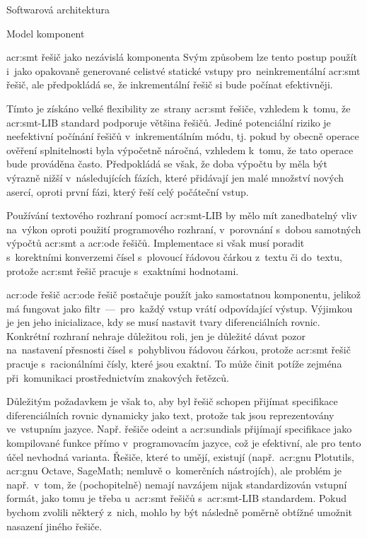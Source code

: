 \documentclass[thesis=M,czech]{FITthesis}[2012/06/26]
\newcommand{\acrlabel}[1]{acr:#1}
\newcommand{\acr}[1]{\acrshort{\acrlabel{#1}}}
\begin{document}
\begin{section}{Softwarová architektura}
\begin{subsection}{Model komponent}
\begin{subsubsection}{\acr{smt} řešič jako nezávislá komponenta}
Svým způsobem lze tento postup použít
i~jako opakovaně generované celistvé statické vstupy
pro~neinkrementální \acr{smt} řešič,
ale předpokládá se, že inkrementální řešič
si bude počínat efektivněji.

Tímto je získáno velké flexibility
ze~strany \acr{smt} řešiče,
vzhledem k~tomu, že \acr{smt}-LIB standard
podporuje většina řešičů.
Jediné potenciální riziko
je neefektivní počínání řešičů
v~inkrementálním módu,
tj. pokud by obecně operace ověření splnitelnosti
byla výpočetně náročná,
vzhledem k~tomu, že tato operace bude prováděna často.
Předpokládá se však,
že doba výpočtu by měla být výrazně nižší
v~následujících fázích,
které přidávají jen malé množství nových asercí,
oproti první fázi,
který řeší celý počáteční vstup.

Používání textového rozhraní pomocí \acr{smt}-LIB
by mělo mít zanedbatelný vliv na~výkon
oproti použití programového rozhraní,
v~porovnání s~dobou samotných výpočtů
\acr{smt} a \acr{ode} řešičů.
Implementace si však musí poradit
s~korektními konverzemi čísel s~plovoucí řádovou čárkou
z~textu či do~textu,
protože \acr{smt} řešič pracuje s~exaktními hodnotami.
\end{subsubsection} %


\begin{subsubsection}{\acr{ode} řešič}\label{sss:design:arch:comp:ode}
\acr{ode} řešič postačuje použít jako samostatnou komponentu,
jelikož má fungovat jako
filtr~---~pro~každý vstup vrátí odpovídající výstup.
Výjimkou je jen jeho inicializace,
kdy se musí nastavit tvary diferenciálních rovnic.
Konkrétní rozhraní nehraje důležitou roli,
jen je důležité dávat pozor na~nastavení přesnosti
čísel s~pohyblivou řádovou čárkou,
protože \acr{smt} řešič pracuje s~racionálními čísly,
které jsou exaktní. To může činit potíže zejména
při~komunikaci prostřednictvím znakových řetězců.

Důležitým požadavkem je však to,
aby byl řešič schopen přijímat
specifikace diferenciálních rovnic
dynamicky jako text,
protože tak jsou reprezentovány ve~vstupním jazyce.
Např. řešiče odeint a \acr{sundials}
přijímají specifikace jako kompilované funkce
přímo v~programovacím jazyce,
což je efektivní, ale pro tento účel
nevhodná varianta.
Řešiče, které to umějí, existují
(např.~\acr{gnu} Plotutils,
\acr{gnu} Octave, SageMath;
nemluvě o~komerčních nástrojích),
ale problém je např.~v~tom,
že (pochopitelně) nemají navzájem
nijak standardizován vstupní formát,
jako tomu je třeba u~\acr{smt} řešičů
s~\acr{smt}-LIB standardem.
Pokud bychom zvolili některý z~nich,
mohlo by být následně poměrně obtížné umožnit
nasazení jiného řešiče.


\end{subsubsection}
\end{subsection}
\end{section}
\end{document}
